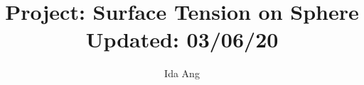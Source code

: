 \documentclass[12pt,3p]{article}
\numberwithin{equation}{section}
\begin{document}
\title{Project: Surface Tension on Sphere \\
	\large{Updated: 03/06/20}}
\author{Ida Ang}
\date{\vspace{-5ex}}
\maketitle

\tableofcontents
\newpage

\end{document}
